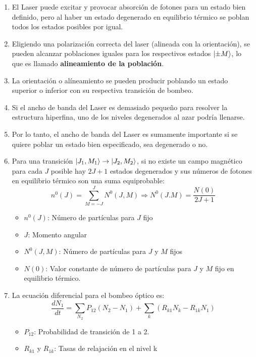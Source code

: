 \documentclass[aps,rmp,reprint,longbibliography]{revtex4-1}
\begin{document}
\begin{enumerate}
\item El Laser puede excitar y provocar absorción de fotones para un estado bien definido, pero al haber un estado degenerado en equilibrio térmico se poblan todos los estados posibles por igual.
\item Eligiendo una polarización correcta del laser (alineada con la orientación), se pueden alcanzar poblaciones iguales para los respectivos estados $\ket{\pm M}$, lo que es llamado \textbf{alineamiento de la población}. 
\item La orientación o alíneamiento se pueden producir poblando un estado superior o inferior con su respectiva transición de bombeo. 
\item Si el ancho de banda del Laser es demasiado pequeño para resolver la estructura hiperfina, uno de los niveles degenerados al azar podría llenarse. 
\item Por lo tanto, el ancho de banda del Laser es sumamente importante si se quiere poblar un estado bien especificado, sea degenerado o no.
\item Para una transición $\ket{J_1,M_1}\rightarrow\ket{J_2,M_2}$, si no existe un campo magnético para cada $J$ posible hay $2J+1$ estados degenerados y sus números de fotones en equilibrio térmico son una suma equiprobable:
\begin{equation}\label{eq4}n^0(J)=\sum_{M=-J}^J N^0(J,M) \Rightarrow N^0(J.M)=\frac{N(0)}{2J+1}\end{equation}
\begin{itemize}
    \item $n^0(J)$: Número de partículas para $J$ fijo
    \item $J$: Momento angular
    \item $N^0(J,M)$: Número de partículas para $J$ y $M$ fijos
    \item $N(0)$: Valor constante de número de partículas para $J$ y $M$ fijo en equilibrio térmico.
\end{itemize}
\item La ecuación diferencial para el bombeo óptico es:
\begin{equation}\label{eq5}\frac{dN_1}{dt}=\sum_{N_2}P_{12}(N_2-N_1)+\sum_{k}(R_{k1}N_k-R_{1k}N_1)\end{equation}
\begin{itemize}
    \item $P_{12}$: Probabilidad de transición de 1 a  2.
    \item $R_{k1}$ y $R_{1k}$: Tasas de relajación en el nivel k
\end{itemize}

\end{enumerate}
\end{document}
